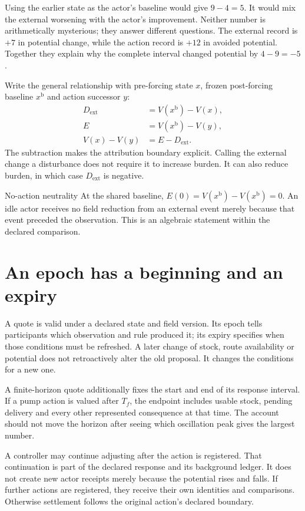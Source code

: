 Using the earlier state as the actor's baseline would give $9-4=5$. It would mix the external worsening with the actor's improvement. Neither number is arithmetically mysterious; they answer different questions. The external record is $+7$ in potential change, while the action record is $+12$ in avoided potential. Together they explain why the complete interval changed potential by $4-9=-5$.

Write the general relationship with pre-forcing state $x$, frozen post-forcing baseline $x^{\mathrm{b}}$ and action successor $y$:
\begin{align}
 D_{\mathrm{ext}}&=V(x^{\mathrm{b}})-V(x),\\
 E&=V(x^{\mathrm{b}})-V(y),\\
 V(x)-V(y)&=E-D_{\mathrm{ext}}.
\end{align}
The subtraction makes the attribution boundary explicit. Calling the external change a disturbance does not require it to increase burden. It can also reduce burden, in which case $D_{\mathrm{ext}}$ is negative.

\begin{lawbox}{No-action neutrality}
At the shared baseline, $E(0)=V(x^{\mathrm{b}})-V(x^{\mathrm{b}})=0$. An idle actor receives no field reduction from an external event merely because that event preceded the observation. This is an algebraic statement within the declared comparison.
\end{lawbox}

\section{An epoch has a beginning and an expiry}
A quote is valid under a declared state and field version. Its epoch tells participants which observation and rule produced it; its expiry specifies when those conditions must be refreshed. A later change of stock, route availability or potential does not retroactively alter the old proposal. It changes the conditions for a new one.

A finite-horizon quote additionally fixes the start and end of its response interval. If a pump action is valued after $T_f$, the endpoint includes usable stock, pending delivery and every other represented consequence at that time. The account should not move the horizon after seeing which oscillation peak gives the largest number.

A controller may continue adjusting after the action is registered. That continuation is part of the declared response and its background ledger. It does not create new actor receipts merely because the potential rises and falls. If further actions are registered, they receive their own identities and comparisons. Otherwise settlement follows the original action's declared boundary.

